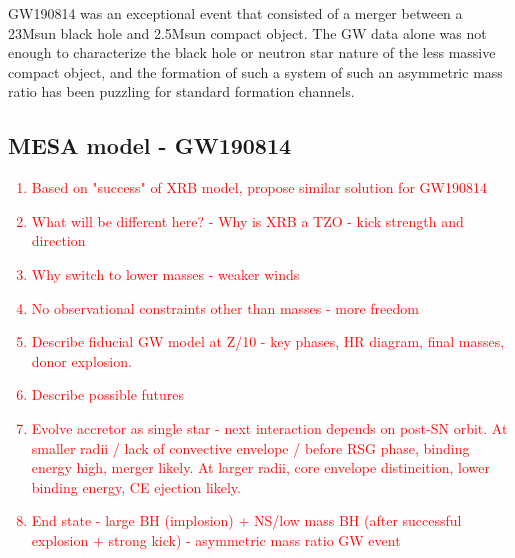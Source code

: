 \documentclass[linenumbers,trackchanges,twocolumn]{aastex701}
\newcommand{\red}{\textcolor{red}}
\begin{document}
GW190814 was an exceptional event that consisted of a merger between a 23Msun black hole and 2.5Msun compact object. The GW data alone was not enough to characterize the black hole or neutron star nature of the less massive compact object, and the formation of such a system of such an asymmetric mass ratio has been puzzling for standard formation channels. 

\subsection{MESA model - GW190814}

\red{
\begin{enumerate}
    \item Based on "success" of XRB model, propose similar solution for GW190814
    \item What will be different here? - Why is XRB a TZO - kick strength and direction
    \item Why switch to lower masses - weaker winds
    \item No observational constraints other than masses - more freedom
    \item Describe fiducial GW model at Z/10 - key phases, HR diagram, final masses, donor explosion.
    \item Describe possible futures
    \item Evolve accretor as single star - next interaction depends on post-SN orbit. At smaller radii / lack of convective envelope / before RSG phase, binding energy high, merger likely. At larger radii, core envelope distincition, lower binding energy, CE ejection likely.
    \item End state - large BH (implosion) + NS/low mass BH (after successful explosion + strong kick) - asymmetric mass ratio GW event
\end{enumerate}
}
\end{document}
